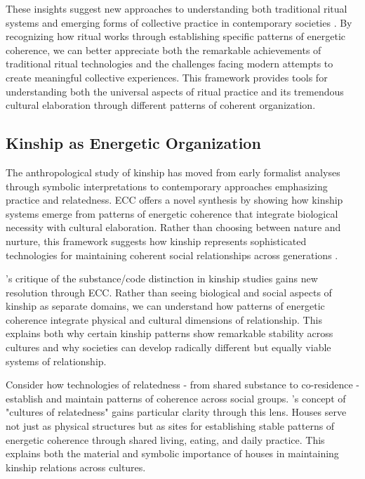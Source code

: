 \begin{refsection}
These insights suggest new approaches to understanding both traditional ritual systems and emerging forms of collective practice in contemporary societies \cite{bloch1989ritual}. By recognizing how ritual works through establishing specific patterns of energetic coherence, we can better appreciate both the remarkable achievements of traditional ritual technologies and the challenges facing modern attempts to create meaningful collective experiences. This framework provides tools for understanding both the universal aspects of ritual practice and its tremendous cultural elaboration through different patterns of coherent organization.

\subsection{Kinship as Energetic Organization}

The anthropological study of kinship has moved from early formalist analyses through symbolic interpretations to contemporary approaches emphasizing practice and relatedness. ECC offers a novel synthesis by showing how kinship systems emerge from patterns of energetic coherence that integrate biological necessity with cultural elaboration. Rather than choosing between nature and nurture, this framework suggests how kinship represents sophisticated technologies for maintaining coherent social relationships across generations \cite{carsten2004after}.

\cite{schneider1984critique}'s critique of the substance/code distinction in kinship studies gains new resolution through ECC. Rather than seeing biological and social aspects of kinship as separate domains, we can understand how patterns of energetic coherence integrate physical and cultural dimensions of relationship. This explains both why certain kinship patterns show remarkable stability across cultures and why societies can develop radically different but equally viable systems of relationship.

Consider how technologies of relatedness - from shared substance to co-residence - establish and maintain patterns of coherence across social groups. \cite{carsten2000cultures}'s concept of "cultures of relatedness" gains particular clarity through this lens. Houses serve not just as physical structures but as sites for establishing stable patterns of energetic coherence through shared living, eating, and daily practice. This explains both the material and symbolic importance of houses in maintaining kinship relations across cultures.


\end{refsection}
